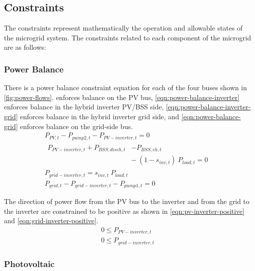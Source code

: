 \subsection{Constraints}

The constraints represent mathematically the operation and allowable states of the microgrid system. The constraints related to each component of the microgrid are as follows:

\subsubsection{Power Balance}

There is a power balance constraint equation for each of the four buses shown in \cref{fig:power-flows}.  enforces balance on the PV bus, \cref{eqn:power-balance-inverter} enforces balance in the hybrid inverter PV/BSS side, \cref{eqn:power-balance-inverter-grid} enforces balance in the hybrid inverter grid side, and \cref{eqn:power-balance-grid} enforces balance on the grid-side bus.
%
\begin{gather}
\label{eqn:power-balance-PV}
P_{PV,t} - P_{pump2,t} - P_{PV-inverter,t} = 0 \\
\label{eqn:power-balance-inverter}
\begin{split}
P_{PV-inverter,t} + P_{BSS,disch,t}& - P_{BSS,ch,t} \\
 &{-} \: \left( 1 - s_{inv,t}\right) \ P_{load,t} = 0 
\end{split}
\\
\label{eqn:power-balance-inverter-grid}
P_{grid-inverter,t} = s_{inv,t} \ P_{load,t} \\
\label{eqn:power-balance-grid}
P_{grid,t} - P_{grid-inverter,t} - P_{pump1,t} = 0
\end{gather}

The direction of power flow from the PV bus to the inverter and from the grid to the inverter are constrained to be positive as shown in \cref{eqn:pv-inverter-positive} and \cref{eqn:grid-inverter-positive}.
%
\begin{gather}
\label{eqn:pv-inverter-positive}
0 \le P_{PV-inverter,t} \\
\label{eqn:grid-inverter-positive}
0 \le P_{grid-inverter,t}
\end{gather}

\subsubsection{Photovoltaic}

